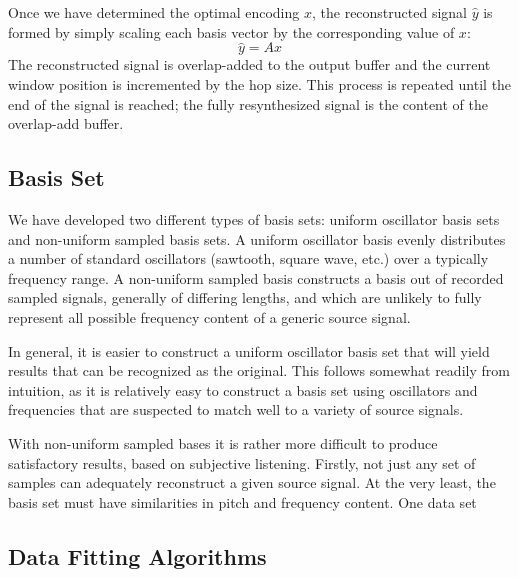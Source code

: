 \documentclass[twoside,a4paper]{article}
\begin{document}
Once we have determined the optimal encoding \(x\), the reconstructed signal \(\hat{y}\) is formed by simply scaling each basis vector by the corresponding value of \(x\):
\begin{equation}
\hat{y} = Ax
\end{equation}
The reconstructed signal is overlap-added to the output buffer and the current window position is incremented by the hop size. This process is repeated until the end of the signal is reached; the fully resynthesized signal is the content of the overlap-add buffer. 

\subsection{Basis Set}
\label{ssec:basisset}
We have developed two different types of basis sets: uniform oscillator basis sets and non-uniform sampled basis sets. 
A uniform oscillator basis evenly distributes a number of standard oscillators (sawtooth, square wave, etc.) over a typically frequency range. 
A non-uniform sampled basis constructs a basis out of recorded sampled signals, generally of differing lengths, and which are unlikely to fully represent all possible frequency content of a generic source signal. 

In general, it is easier to construct a uniform oscillator basis set that will yield results that can be recognized as the original. 
This follows somewhat readily from intuition, as it is relatively easy to construct a basis set using oscillators and frequencies that are suspected to match well to a variety of source signals. 

With non-uniform sampled bases it is rather more difficult to produce satisfactory results, based on subjective listening. 
Firstly, not just any set of samples can adequately reconstruct a given source signal. 
At the very least, the basis set must have similarities in pitch and frequency content. 
One data set 

\subsection{Data Fitting Algorithms}
\label{ssec:datafittingalgorithm}

\cite{figueiredo2007gradient}


\end{document}
